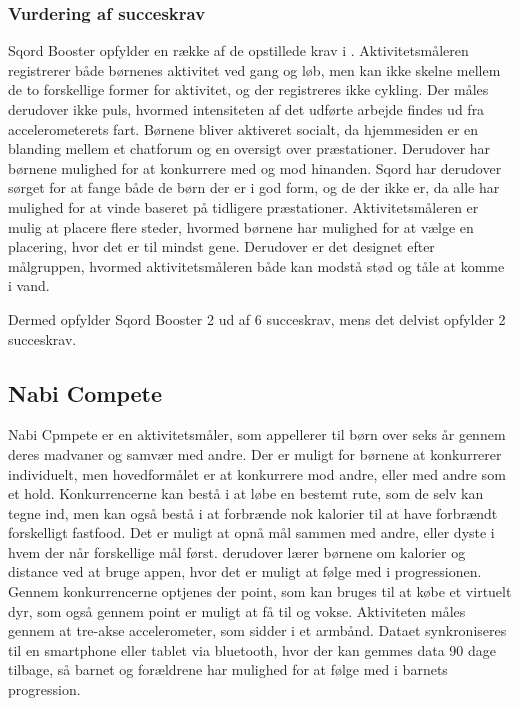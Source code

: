 \subsubsection{Vurdering af succeskrav}
Sqord Booster opfylder en række af de opstillede krav i . Aktivitetsmåleren registrerer både børnenes aktivitet ved gang og løb, men kan ikke skelne mellem de to forskellige former for aktivitet, og der registreres ikke cykling. Der måles derudover ikke puls, hvormed intensiteten af det udførte arbejde findes ud fra accelerometerets fart. \newline
Børnene bliver aktiveret socialt, da hjemmesiden er en blanding mellem et chatforum og en oversigt over præstationer. Derudover har børnene mulighed for at konkurrere med og mod hinanden. Sqord har derudover sørget for at fange både de børn der er i god form, og de der ikke er, da alle har mulighed for at vinde baseret på tidligere præstationer. Aktivitetsmåleren er mulig at placere flere steder, hvormed børnene har mulighed for at vælge en placering, hvor det er til mindst gene. Derudover er det designet efter målgruppen, hvormed aktivitetsmåleren både kan modstå stød og tåle at komme i vand.  

Dermed opfylder Sqord Booster 2 ud af 6 succeskrav, mens det delvist opfylder 2 succeskrav.

\subsection{Nabi Compete}
Nabi Cpmpete er en aktivitetsmåler, som appellerer til børn over seks år gennem deres madvaner og samvær med andre. Der er muligt for børnene at konkurrerer individuelt, men hovedformålet er at konkurrere mod andre, eller med andre som et hold. Konkurrencerne kan bestå i at løbe en bestemt rute, som de selv kan tegne ind, men kan også bestå i at forbrænde nok kalorier til at have forbrændt forskelligt fastfood. Det er muligt at opnå mål sammen med andre, eller dyste i hvem der når forskellige mål først. derudover lærer børnene om kalorier og distance ved at bruge appen, hvor det er muligt at følge med i progressionen. Gennem konkurrencerne optjenes der point, som kan bruges til at købe et virtuelt dyr, som også gennem point er muligt at få til og vokse. 
Aktiviteten måles gennem at tre-akse accelerometer, som sidder i et armbånd. Dataet synkroniseres til en smartphone eller tablet via bluetooth, hvor der kan gemmes data 90 dage tilbage, så barnet og forældrene har mulighed for at følge med i barnets progression. 


